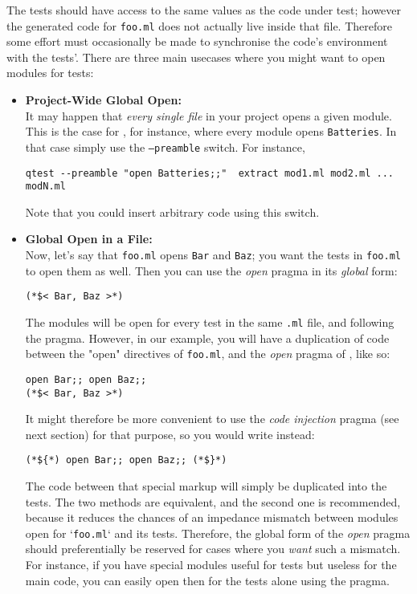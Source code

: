 
The tests should have access to the same values as the code under test; however the
generated code for \texttt{foo.ml} does not actually live inside that file. Therefore some
effort must occasionally be made to synchronise the code's environment with the tests'.
There are three main usecases where you might want to open modules for tests:

\begin{itemize}
 \item \textbf{Project-Wide Global Open:}\\
It may happen that \emph{every single file} in your project
opens a given module. This is the case for \bat, for instance, where every module
opens \texttt{Batteries}. In that case simply use the \texttt{--preamble} switch. For instance,
\begin{verbatim}
qtest --preamble "open Batteries;;"  extract mod1.ml mod2.ml ... modN.ml
\end{verbatim}
Note that you could insert arbitrary code using this switch.

\item \textbf{Global Open in a File:}\\
 Now, let's say that \texttt{foo.ml} opens \texttt{Bar} and \texttt{Baz}; you want
the tests in \texttt{foo.ml} to open them as well. Then you can use the \emph{open} pragma in its
\emph{global} form:
\begin{verbatim}
(*$< Bar, Baz >*)
\end{verbatim}
The modules will be open for every test in the same \texttt{.ml} file, and following the pragma.
However, in our example, you will have a duplication of code between the "open" directives
of \texttt{foo.ml}, and the \emph{open} pragma of \qtest{}, like so:
\begin{verbatim}
open Bar;; open Baz;;
(*$< Bar, Baz >*)
\end{verbatim}
It might therefore be more convenient to use the \emph{code injection} pragma (see next
section) for that purpose, so you would write instead:
\begin{verbatim}
(*${*) open Bar;; open Baz;; (*$}*)
\end{verbatim}
The code between that special markup will simply be duplicated into the tests. The two
methods are equivalent, and the second one is recommended, because it reduces the chances
of an impedance mismatch between modules open for `\texttt{foo.ml}` and its tests. Therefore, the
global form of the \emph{open} pragma should preferentially be reserved for cases where you
\emph{want} such a mismatch. For instance, if you have special modules useful for tests but
useless for the main code, you can easily open then for the tests alone using the pragma.


\end{itemize}
